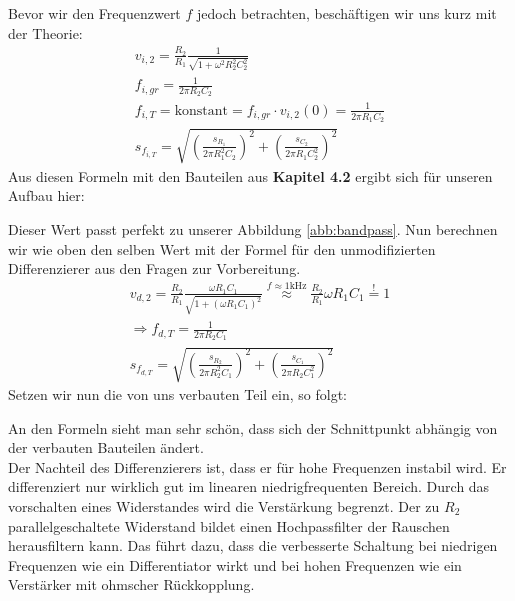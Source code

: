 Bevor wir den Frequenzwert $f$ jedoch betrachten, beschäftigen wir uns kurz mit der Theorie:\newline
\begin{gather}
    v_{i,2} = \frac{R_2}{R_1}\frac{1}{\sqrt{1+\omega ^2 R_{2}^2C_{2}^2}}\\
    f_{i,gr} = \frac{1}{2 \pi R_2 C_2}\\
    f_{i,T} = \text{konstant} = f_{i,gr} \cdot v_{i,2}(0) = \frac{1}{2\pi R_1 C_2 }\\
    s_{f_{i,T}} = \sqrt{(\frac{s_{R_1}}{2 \pi R_{1}^2 C_2})^2+ (\frac{s_{C_2}}{2 \pi R_{1} C_{2}^2})^2}
\end{gather}
Aus diesen Formeln mit den Bauteilen aus \textbf{Kapitel 4.2} ergibt sich für unseren Aufbau hier:
\begin{center}
\end{center}
Dieser Wert passt perfekt zu unserer Abbildung \ref{abb:bandpass}.
Nun berechnen wir wie oben den selben Wert mit der Formel für den unmodifizierten Differenzierer aus den Fragen zur Vorbereitung.
\begin{gather}
    v_{d,2} = \frac{R_2}{R_1} \frac{\omega R_1C_1}{\sqrt{1 + (\omega R_1C_1)^2}} \overset{f \approx 1 \text{kHz}}{\approx} \frac{R_2}{R_1} \omega R_1C_1  \overset{!}{=} 1\\
    \Rightarrow f_{d,T} = \frac{1}{2 \pi R_2 C_1}\\
    s_{f_{d,T}} = \sqrt{(\frac{s_{R_2}}{2 \pi R_{2}^2 C_1})^2+ (\frac{s_{C_1}}{2 \pi R_{2} C_{1}^2})^2}
\end{gather}
Setzen wir nun die von uns verbauten Teil ein, so folgt:
\begin{center}
\end{center}
An den Formeln sieht man sehr schön, dass sich der Schnittpunkt abhängig von der verbauten
Bauteilen ändert.\\
Der Nachteil des Differenzierers ist, dass er für hohe Frequenzen instabil wird. Er differenziert nur
wirklich gut im linearen niedrigfrequenten Bereich. Durch das vorschalten eines Widerstandes wird die Verstärkung begrenzt.
Der zu $R_2$ parallelgeschaltete Widerstand bildet einen Hochpassfilter der Rauschen herausfiltern kann.
Das führt dazu, dass die verbesserte Schaltung bei niedrigen Frequenzen wie ein Differentiator wirkt und bei hohen
Frequenzen wie ein Verstärker mit ohmscher Rückkopplung.\footnotemark
{}

